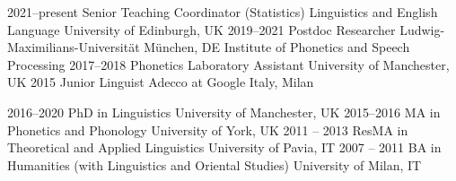 \documentclass[9pt]{developercv} %
\begin{document}






\begin{entrylist}
	\entry
		{2021--present}
		{Senior Teaching Coordinator (Statistics)}
		{Linguistics and English Language}
		{University of Edinburgh, UK}
	\entry
		{2019--2021}
		{Postdoc Researcher}
		{Ludwig-Maximilians-Universität München, DE}
		{Institute of Phonetics and Speech Processing}
	\entry
		{2017--2018}
		{Phonetics Laboratory Assistant}
		{University of Manchester, UK}
		{}
	\entry
		{2015}
		{Junior Linguist}
		{Adecco at Google Italy, Milan}
		{}
\end{entrylist}



\begin{entrylist}
	\entry
		{2016--2020}
		{PhD in Linguistics}
		{University of Manchester, UK}
		{}
	\entry
		{2015--2016}
		{MA in Phonetics and Phonology}
		{University of York, UK}
		{}
	\entry
		{2011 -- 2013}
		{ResMA in Theoretical and Applied Linguistics}
		{University of Pavia, IT}
		{}
	\entry
		{2007 -- 2011}
		{BA in Humanities (with Linguistics and Oriental Studies)}
		{University of Milan, IT}
		{}
\end{entrylist}
\end{document}
